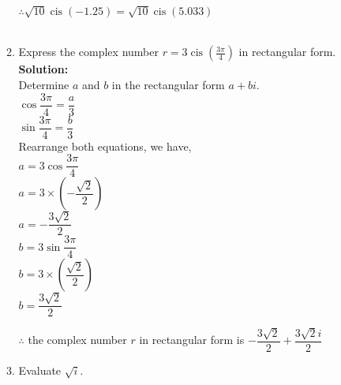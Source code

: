\documentclass[12pt]{book}
\DeclareMathOperator\cis{cis} %
\begin{document}
\begin{enumerate}
\begin{enumerate}
$\therefore \sqrt{10} \cis(-1.25) = \sqrt{10} \cis(5.033)$\\\\
\item Express the complex number $r=3\cis(\frac{3\pi}{4})$ in rectangular form.\\

\textbf{Solution:}\\
Determine $a$ and $b$ in the rectangular form $a + bi$.\\

$\cos \dfrac{3\pi}{4} = \dfrac{a}{3}$\\

$\sin \dfrac{3\pi}{4} = \dfrac{b}{3}$\\

Rearrange both equations, we have, \\
$a = 3 \cos \dfrac{3\pi}{4}$ \\
$a = 3 \times \left(-\dfrac{\sqrt{2}}{2}\right)$ \\
$a = - \dfrac{3\sqrt{2}}{2}$ \\

$b = 3 \sin \dfrac{3\pi}{4}$\\
$b = 3 \times \left(\dfrac{\sqrt{2}}{2}\right)$\\
$b =  \dfrac{3\sqrt{2}}{2}$

$\therefore $ the complex number $r$ in rectangular form is $- \dfrac{3\sqrt{2}}{2} + \dfrac{3\sqrt{2}i}{2}$

\item Evaluate $\sqrt{i}$.\\


\end{enumerate}
\end{enumerate}
\end{document}
